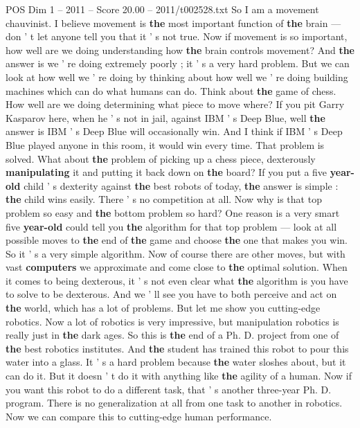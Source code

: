 \begin{textsample}{POS Dim 1 – 2011 – Score 20.00 – 2011/t002528.txt}
So I am a movement chauvinist.
I believe movement is \textbf{the} most important function of \textbf{the} brain — don ' t let anyone tell you that it ' s not true.
Now if movement is so important, how well are we doing understanding how \textbf{the} brain controls movement?
And \textbf{the} answer is we ' re doing extremely poorly ; it ' s a very hard problem.
But we can look at how well we ' re doing by thinking about how well we ' re doing building machines which can do what humans can do.
Think about \textbf{the} game of chess.
How well are we doing determining what piece to move where?
If you pit Garry Kasparov here, when he ' s not in jail, against IBM ' s Deep Blue, well \textbf{the} answer is IBM ' s Deep Blue will occasionally win.
And I think if IBM ' s Deep Blue played anyone in this room, it would win every time.
That problem is solved.
What about \textbf{the} problem of picking up a chess piece, dexterously \textbf{manipulating} it and putting it back down on \textbf{the} board?
If you put a five \textbf{year-old} child ' s dexterity against \textbf{the} best robots of today, \textbf{the} answer is simple : \textbf{the} child wins easily.
There ' s no competition at all.
Now why is that top problem so easy and \textbf{the} bottom problem so hard?
One reason is a very smart five \textbf{year-old} could tell you \textbf{the} algorithm for that top problem — look at all possible moves to \textbf{the} end of \textbf{the} game and choose \textbf{the} one that makes you win.
So it ' s a very simple algorithm.
Now of course there are other moves, but with vast \textbf{computers} we approximate and come close to \textbf{the} optimal solution.
When it comes to being dexterous, it ' s not even clear what \textbf{the} algorithm is you have to solve to be dexterous.
And we ' ll see you have to both perceive and act on \textbf{the} world, which has a lot of problems.
But let me show you cutting-edge robotics.
Now a lot of robotics is very impressive, but manipulation robotics is really just in \textbf{the} dark ages.
So this is \textbf{the} end of a Ph.
D. project from one of \textbf{the} best robotics institutes.
And \textbf{the} student has trained this robot to pour this water into a glass.
It ' s a hard problem because \textbf{the} water sloshes about, but it can do it.
But it doesn ' t do it with anything like \textbf{the} agility of a human.
Now if you want this robot to do a different task, that ' s another three-year Ph.
D. program.
There is no generalization at all from one task to another in robotics.
Now we can compare this to cutting-edge human performance.

\end{textsample}
